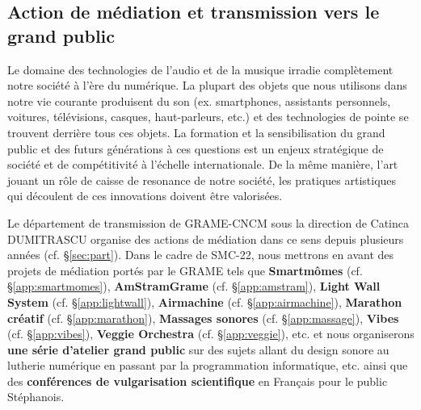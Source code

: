 \documentclass[fontsize=12pt]{scrartcl} %
\numberwithin{equation}{section} %
\numberwithin{table}{section} %
\begin{document}
\subsection{Action de médiation et transmission vers le grand public}

Le domaine des technologies de l'audio et de la musique irradie complètement notre société à l'ère du numérique. La plupart des objets que nous utilisons dans notre vie courante produisent du son (ex. smartphones, assistants personnels, voitures, télévisions, casques, haut-parleurs, etc.) et des technologies de pointe se trouvent derrière tous ces objets. La formation et la sensibilisation du grand public et des futurs générations à ces questions est un enjeux stratégique de société et de compétitivité à l'échelle internationale. De la même manière, l'art jouant un rôle de caisse de resonance de notre société, les pratiques artistiques qui découlent de ces innovations doivent être valorisées. %

Le département de transmission de GRAME-CNCM sous la direction de Catinca DUMITRASCU organise des actions de médiation dans ce sens depuis plusieurs années (cf. \S\ref{sec:part}). Dans le cadre de SMC-22, nous mettrons en avant des projets de médiation portés par le GRAME tels que \textbf{Smartmômes} (cf. \S\ref{app:smartmomes}), \textbf{AmStramGrame} (cf. \S\ref{app:amstram}), \textbf{Light Wall System} (cf. \S\ref{app:lightwall}), \textbf{Airmachine} (cf. \S\ref{app:airmachine}), \textbf{Marathon créatif} (cf. \S\ref{app:marathon}), \textbf{Massages sonores} (cf. 
\S\ref{app:massage}), \textbf{Vibes} (cf. \S\ref{app:vibes}), \textbf{Veggie Orchestra} (cf. \S\ref{app:veggie}), etc. et nous organiserons \textbf{une série d'atelier grand public} sur des sujets allant du design sonore au lutherie numérique en passant par la programmation informatique, etc. ainsi que des \textbf{conférences de vulgarisation scientifique} en Français pour le public Stéphanois.
\end{document}
